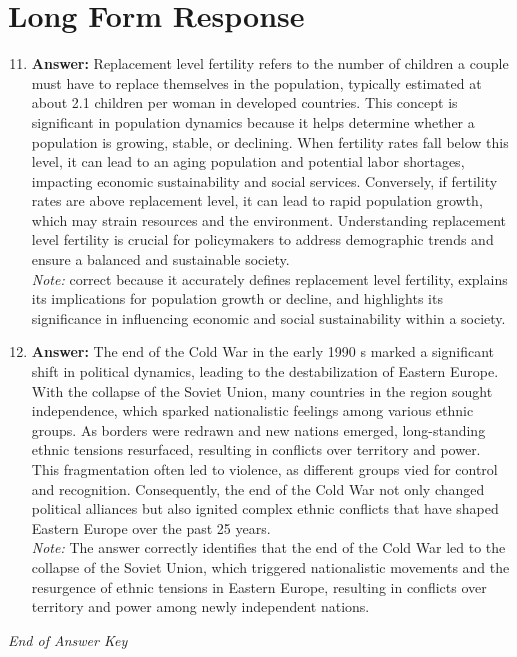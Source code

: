 \documentclass[12pt]{article}
\begin{document}
\section*{Long Form Response}
\begin{enumerate}[label=\arabic*.]
\setcounter{enumi}{10}
\item \textbf{Answer:} Replacement level fertility refers to the number of children a couple must have to replace themselves in the population, typically estimated at about 2.1 children per woman in developed countries. This concept is significant in population dynamics because it helps determine whether a population is growing, stable, or declining. When fertility rates fall below this level, it can lead to an aging population and potential labor shortages, impacting economic sustainability and social services. Conversely, if fertility rates are above replacement level, it can lead to rapid population growth, which may strain resources and the environment. Understanding replacement level fertility is crucial for policymakers to address demographic trends and ensure a balanced and sustainable society.
\\ \textit{Note:} correct because it accurately defines replacement level fertility, explains its implications for population growth or decline, and highlights its significance in influencing economic and social sustainability within a society.
\item \textbf{Answer:} The end of the Cold War in the early 1990 s marked a significant shift in political dynamics, leading to the destabilization of Eastern Europe. With the collapse of the Soviet Union, many countries in the region sought independence, which sparked nationalistic feelings among various ethnic groups. As borders were redrawn and new nations emerged, long-standing ethnic tensions resurfaced, resulting in conflicts over territory and power. This fragmentation often led to violence, as different groups vied for control and recognition. Consequently, the end of the Cold War not only changed political alliances but also ignited complex ethnic conflicts that have shaped Eastern Europe over the past 25 years.
\\ \textit{Note:} The answer correctly identifies that the end of the Cold War led to the collapse of the Soviet Union, which triggered nationalistic movements and the resurgence of ethnic tensions in Eastern Europe, resulting in conflicts over territory and power among newly independent nations.
\end{enumerate}

\vfill
\noindent\textit{End of Answer Key}
\end{document}
